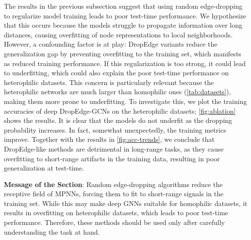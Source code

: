The results in the previous subsection suggest that using random edge-dropping to regularize model training leads to poor test-time performance. We hypothesize that this occurs because the models struggle to propagate information over long distances, causing overfitting of node representations to local neighborhoods. However, a confounding factor is at play: DropEdge variants reduce the generalization gap by preventing overfitting to the training set, which manifests as reduced training performance. If this regularization is too strong, it could lead to underfitting, which could also explain the poor test-time performance on heterophilic datasets. This concern is particularly relevant because the heterophilic networks are much larger than homophilic ones (\autoref{tab:datasets}), making them more prone to underfitting. To investigate this, we plot the training accuracies of deep DropEdge-GCNs on the heterophilic datasets; \autoref{fig:ablation} shows the results. It is clear that the models do not underfit as the dropping probability increases. In fact, somewhat unexpectedly, the training metrics improve. Together with the results in \autoref{fig:acc-trends}, we conclude that DropEdge-like methods are detrimental in long-range tasks, as they cause overfitting to short-range artifacts in the training data, resulting in poor generalization at test-time.

\begin{tcolorbox}[boxsep=0mm,left=2.5mm,right=2.5mm]
    \textbf{Message of the Section}: Random edge-dropping algorithms reduce the receptive field of MPNNs, forcing them to fit to short-range signals in the training set. While this may make deep GNNs suitable for homophilic datasets, it results in overfitting on heterophilic datasets, which leads to poor test-time performance. Therefore, these methods should be used only after carefully understanding the task at hand.
\end{tcolorbox}